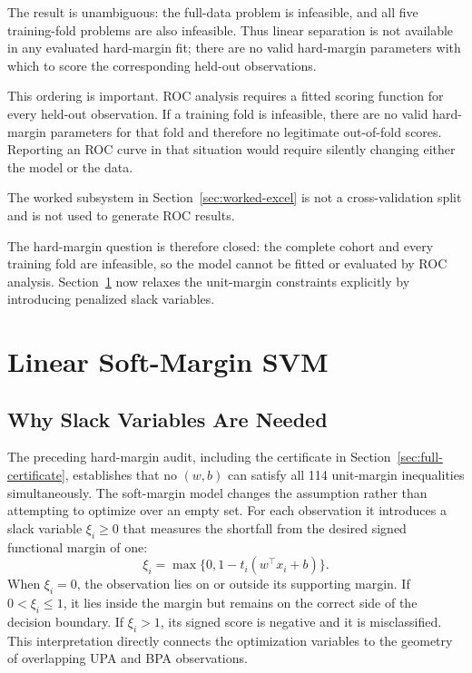 \documentclass[11pt,a4paper]{article}
\numberwithin{equation}{section} %
\begin{document}
The result is unambiguous: the full-data problem is infeasible, and all five
training-fold problems are also infeasible. Thus linear separation is not
available in any evaluated hard-margin fit; there are no valid hard-margin
parameters with which to score the corresponding held-out observations.

This ordering is important. ROC analysis requires a fitted scoring function for every held-out observation. If a training fold is infeasible, there are no valid hard-margin parameters for that fold and therefore no legitimate out-of-fold scores. Reporting an ROC curve in that situation would require silently changing either the model or the data.

The worked subsystem in Section~\ref{sec:worked-excel} is not a cross-validation split and is not used to generate ROC results.

The hard-margin question is therefore closed: the complete cohort and every
training fold are infeasible, so the model cannot be fitted or evaluated by
ROC analysis. Section~\ref{sec:soft-margin} now relaxes the unit-margin
constraints explicitly by introducing penalized slack variables.

\section{Linear Soft-Margin SVM}
\label{sec:soft-margin}

\subsection{Why Slack Variables Are Needed}

The preceding hard-margin audit, including the certificate in
Section~\ref{sec:full-certificate}, establishes that no $(w,b)$ can satisfy
all 114 unit-margin inequalities simultaneously. The soft-margin model changes the
assumption rather than attempting to optimize over an empty set. For each
observation it introduces a slack variable $\xi_i\geq0$ that measures the
shortfall from the desired signed functional margin of one:
\begin{equation}
    \xi_i=\max\{0,1-t_i(w^\top x_i+b)\}.
\end{equation}
When $\xi_i=0$, the observation lies on or outside its supporting margin. If
$0<\xi_i\leq1$, it lies inside the margin but remains on the correct side of
the decision boundary. If $\xi_i>1$, its signed score is negative and it is
misclassified. This interpretation directly connects the optimization
variables to the geometry of overlapping UPA and BPA observations.
\end{document}
